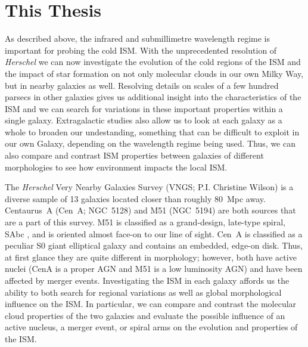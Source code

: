 \section{This Thesis}\label{thesis_outline}
As described above, the infrared and submillimetre wavelength regime is important for probing the cold ISM.  With the unprecedented resolution of \emph{Herschel} we can now investigate the evolution of the cold regions of the ISM and the impact of star formation on not only molecular clouds in our own Milky Way, but in nearby galaxies as well.  Resolving details on scales of a few hundred parsecs in other galaxies gives us additional insight into the characteristics of the ISM and we can search for variations in these important properties within a single galaxy.  Extragalactic studies also allow us to look at each galaxy as a whole to broaden our undestanding, something that can be difficult to exploit in our own Galaxy, depending on the wavelength regime being used.  Thus, we can also compare and contrast ISM properties between galaxies of different morphologies to see how environment impacts the local ISM.

The \emph{Herschel} Very Nearby Galaxies Survey (VNGS; P.I. Christine Wilson) is a diverse sample of 13 galaxies located closer than roughly 80~Mpc away.  Centaurus~A (Cen~A; NGC~5128) and M51 (NGC~5194) are both sources that are a part of this survey.  M51 is classified as a grand-design, late-type spiral, SAbc \citep{1991trcb.book.....D}, and is oriented almost face-on to our line of sight.  Cen~A is classified as a peculiar S0 giant elliptical galaxy \citep{1991trcb.book.....D} and contains an embedded, edge-on disk.  Thus, at first glance they are quite different in morphology; however, both have active nuclei (CenA is a proper AGN and M51 is a low luminosity AGN) and have been affected by merger events.  Investigating the ISM in each galaxy affords us the ability to both search for regional variations as well as global morphological influence on the ISM.  In particular, we can compare and contrast the molecular cloud properties of the two galaxies and evaluate the possible influence of an active nucleus, a merger event, or spiral arms on the evolution and properties of the ISM.

